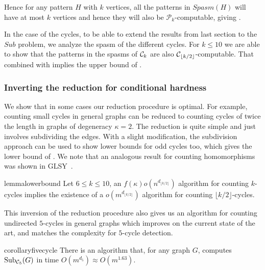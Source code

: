 \documentclass[a4paper,UKenglish,cleveref, autoref, numberwithinsect, thm-restate]{lipics-v2021}
\newcommand{\computable}[1]{${#1}$-computable}
\newcommand{\cycle}[1]{\cC_{#1}}
\newcommand{\Sub}[2]{\mathrm{Sub}_{#2}(#1)}
\newcommand{\Spasm}{Spasm}
\newcommand{\degen}{\kappa}
\newcommand{\cC}{{\cal C}}
\newcommand{\cP}{\mathcal{P}}
\begin{document}
	Hence for any pattern $H$ with $k$ vertices, all the patterns in $\Spasm(H)$ will have at most $k$ vertices and hence they will also be \computable{\cP_k}, giving .
	
	In the case of the cycles, to be able to extend the results from last section to the $Sub$ problem, we analyze the spasm of the different cycles. For $k\leq 10$ we are able to show that the patterns in the spasms of $\cycle{k}$ are also \computable{\cycle{\lfloor k/2 \rfloor}}. That combined with  implies the upper bound of .
	
    \subsubsection{Inverting the reduction for conditional hardness} \label{sec:invert}
	
    We show that in some cases our reduction procedure is optimal. For example, counting small cycles in general graphs can be reduced to counting cycles of twice the length in graphs of degeneracy $\kappa=2$. The reduction is quite simple and just involves subdividing the edges. With a slight modification, the subdivision approach can be used to show lower bounds for odd cycles too, which gives the lower bound of . We note that an analogous result for counting homomorphisms was shown in GLSY~\cite{GiLeSh+23}.
	
	\begin{restatable}{lemma}{lowerbound} \label{lem:lowerbound}
		Let $6\leq k \leq 10$, an $f(\degen)o(n^{d_{\lfloor k/2 \rfloor}})$ algorithm for counting $k$-cycles implies the existence of a $o(m^{d_{\lfloor k/2 \rfloor}})$ algorithm for counting $\lfloor k/2 \rfloor$-cycles. 
	\end{restatable}

	
	 This inversion of the reduction procedure also gives us an algorithm for counting undirected $5$-cycles in general graphs which improves on the current state of the art, and matches the complexity for $5$-cycle detection.
	
	\begin{restatable}{corollary}{fivecycle} \label{cor:5-cycle}
		There is an algorithm that, for any graph $G$, computes $\Sub{G}{\cycle{5}}$ in time $O\left(m^{d_5} \right) \approx O\left(m^{1.63}\right)$.
	\end{restatable}
\end{document}
